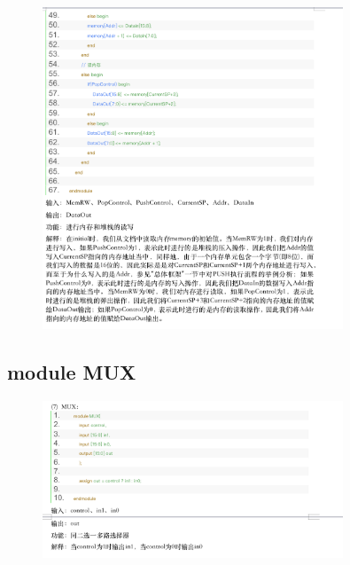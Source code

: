 \documentclass{article}
\begin{document}
\begin{figure}[H]
\centering
\includegraphics[width=0.8\textwidth]{pic/18.png}
\end{figure}

\subsection{module MUX}
\begin{figure}[H]
    \centering
    \includegraphics[width=0.8\textwidth]{pic/19.png}
    \end{figure}
\end{document}
